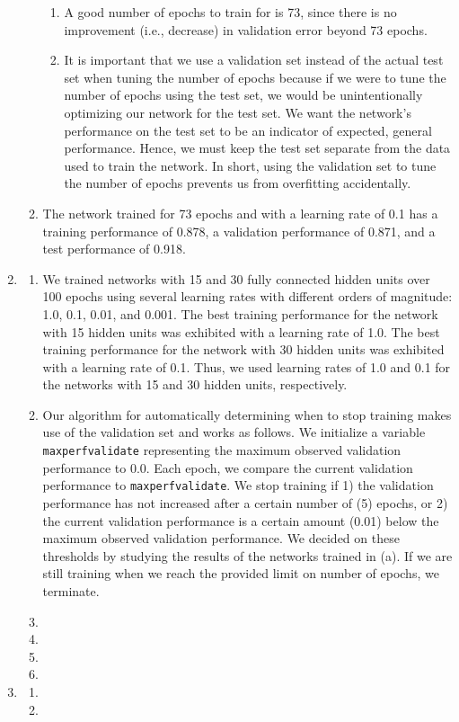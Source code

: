 \documentclass[solution, letterpaper]{cs121}
\begin{document}
\begin{enumerate}
\begin{enumerate}
\begin{enumerate}
				\item A good number of epochs to train for is 73, since there is no improvement (i.e., decrease) in validation error beyond 73 epochs.
				\item It is important that we use a validation set instead of the actual test set when tuning the number of epochs because if we were to tune the number of epochs using the test set, we would be unintentionally optimizing our network for the test set. We want the network's performance on the test set to be an indicator of expected, general performance. Hence, we must keep the test set separate from the data used to train the network. In short, using the validation set to tune the number of epochs prevents us from overfitting accidentally.
			\end{enumerate}
		\item The network trained for 73 epochs and with a learning rate of 0.1 has a training performance of 0.878, a validation performance of 0.871, and a test performance of 0.918.
		\end{enumerate}
	\item
		\begin{enumerate}
			\item We trained networks with 15 and 30 fully connected hidden units over 100 epochs using several learning rates with different orders of magnitude: 1.0, 0.1, 0.01, and 0.001. The best training performance for the network with 15 hidden units was exhibited with a learning rate of 1.0. The best training performance for the network with 30 hidden units was exhibited with a learning rate of 0.1. Thus, we used learning rates of 1.0 and 0.1 for the networks with 15 and 30 hidden units, respectively.
			\item Our algorithm for automatically determining when to stop training makes use of the validation set and works as follows. We initialize a variable {\tt max\textunderscore perf\textunderscore validate} representing the maximum observed validation performance to 0.0. Each epoch, we compare the current validation performance to {\tt max\textunderscore perf\textunderscore validate}. We stop training if 1) the validation performance has not increased after a certain number of  (5) epochs, or 2) the current validation performance is a certain amount (0.01) below the maximum observed validation performance. We decided on these thresholds by studying the results of the networks trained in (a). If we are still training when we reach the provided limit on number of epochs, we terminate.
			\item
			\item
			\item
			\item
		\end{enumerate}
	\item
		\begin{enumerate}
			\item
			\item
		\end{enumerate}
\end{enumerate}
\end{document}
